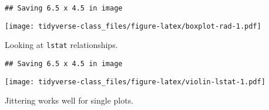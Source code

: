 \documentclass[]{book}
\newenvironment{Shaded}{\begin{snugshade}}{\end{snugshade}}
\newcommand{\KeywordTok}[1]{\textcolor[rgb]{0.13,0.29,0.53}{\textbf{#1}}}
\newcommand{\DataTypeTok}[1]{\textcolor[rgb]{0.13,0.29,0.53}{#1}}
\newcommand{\DecValTok}[1]{\textcolor[rgb]{0.00,0.00,0.81}{#1}}
\newcommand{\StringTok}[1]{\textcolor[rgb]{0.31,0.60,0.02}{#1}}
\newcommand{\OperatorTok}[1]{\textcolor[rgb]{0.81,0.36,0.00}{\textbf{#1}}}
\newcommand{\NormalTok}[1]{#1}
\begin{document}
\begin{verbatim}
## Saving 6.5 x 4.5 in image
\end{verbatim}

\texttt{[image: tidyverse-class\_files/figure-latex/boxplot-rad-1.pdf]}

Looking at \texttt{lstat} relationships.

\begin{Shaded}
\end{Shaded}

\begin{verbatim}
## Saving 6.5 x 4.5 in image
\end{verbatim}

\texttt{[image: tidyverse-class\_files/figure-latex/violin-lstat-1.pdf]}

Jittering works well for single plots.
\end{document}
